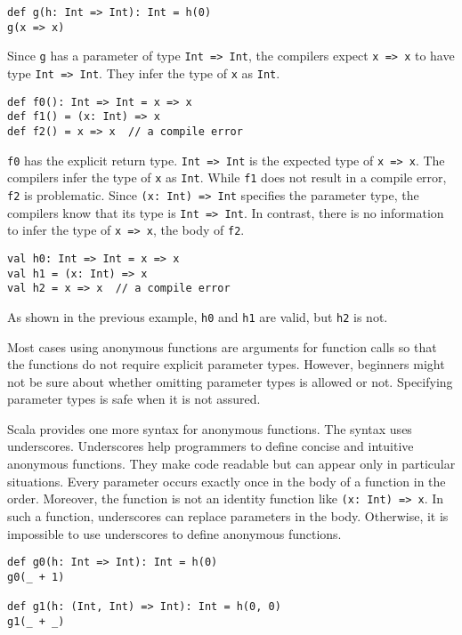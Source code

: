 \begin{verbatim}
def g(h: Int => Int): Int = h(0)
g(x => x)
\end{verbatim}

Since \verb!g! has a parameter of type \verb!Int => Int!, the compilers expect
\verb!x => x! to have type \verb!Int => Int!. They infer the type of \verb!x! as
\verb!Int!.

\begin{verbatim}
def f0(): Int => Int = x => x
def f1() = (x: Int) => x
def f2() = x => x  // a compile error
\end{verbatim}

\verb!f0! has the explicit return type. \verb!Int => Int! is the expected type of
\verb!x => x!. The compilers infer the type of \verb!x! as \verb!Int!. While
\verb!f1! does not result in a compile error, \verb!f2! is problematic. Since
\verb!(x: Int) => Int! specifies the parameter type, the compilers know that its
type is \verb!Int => Int!. In contrast, there is no information to infer the type
of \verb!x => x!, the body of \verb!f2!.

\begin{verbatim}
val h0: Int => Int = x => x
val h1 = (x: Int) => x
val h2 = x => x  // a compile error
\end{verbatim}

As shown in the previous example, \verb!h0! and \verb!h1! are valid, but
\verb!h2! is not.

Most cases using anonymous functions are arguments for function calls so that the
functions do not require explicit parameter types. However, beginners might not
be sure about whether omitting parameter types is allowed or not. Specifying
parameter types is safe when it is not assured.

Scala provides one more syntax for anonymous functions. The syntax uses
underscores. Underscores help programmers to define concise and intuitive
anonymous functions. They make code readable but can appear only in particular
situations. Every parameter occurs exactly once in the body of a function in the
order. Moreover, the function is not an identity function like \verb!(x: Int) => x!.
In such a function, underscores can replace parameters in the body.
Otherwise, it is impossible to use underscores to define anonymous functions.

\begin{verbatim}
def g0(h: Int => Int): Int = h(0)
g0(_ + 1)

def g1(h: (Int, Int) => Int): Int = h(0, 0)
g1(_ + _)
\end{verbatim}

